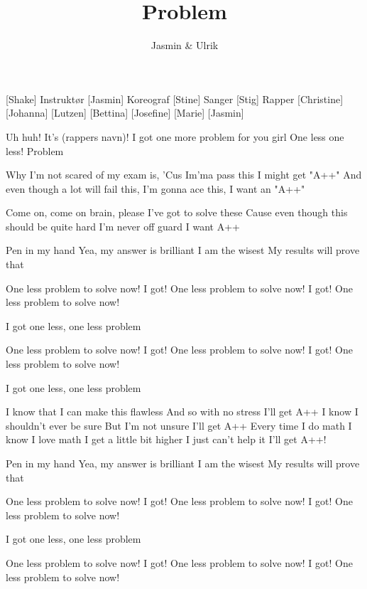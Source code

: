 \documentclass[a4paper,11pt]{article}
\title{Problem}
\author{Jasmin \& Ulrik}
\begin{document}
\maketitle

\begin{roles}
[Shake] Instruktør
[Jasmin] Koreograf
[Stine] Sanger 
[Stig] Rapper
[Christine]
[Johanna]
[Lutzen]
[Bettina]
[Josefine]
[Marie]
[Jasmin]
\end{roles}

\begin{song}



 Uh huh!
It's (rappers navn)!
I got one more problem for you girl
One less one less!
Problem

 Why I'm not scared of my exam is,
'Cus Im'ma pass this
I might get "A++"
And even though a lot will fail this,
I'm gonna ace this,
I want an "A++"

Come on, come on brain, please
I’ve got to solve these
Cause even though this should be quite hard
I’m never off guard
I want A++

Pen in my hand
Yea, my answer is brilliant
I am the wisest
My results will prove that

 One less problem to solve now!
I got!
One less problem to solve now!
I got!
One less problem to solve now!

 I got one less, one less problem

 One less problem to solve now!
I got!
One less problem to solve now!
I got!
One less problem to solve now!

 I got one less, one less problem


 I know that I can make this flawless
And so with no stress
I’ll get A++
I know I shouldn’t ever be sure
But I’m not unsure
I’ll get A++
Every time I do math
I know I love math
I get a little bit higher
I just can’t help it
I’ll get A++!

Pen in my hand
Yea, my answer is brilliant
I am the wisest
My results will prove that

 One less problem to solve now!
I got!
One less problem to solve now!
I got!
One less problem to solve now!

 I got one less, one less problem

 One less problem to solve now!
I got!
One less problem to solve now!
I got!
One less problem to solve now!


\end{song}
\end{document}
